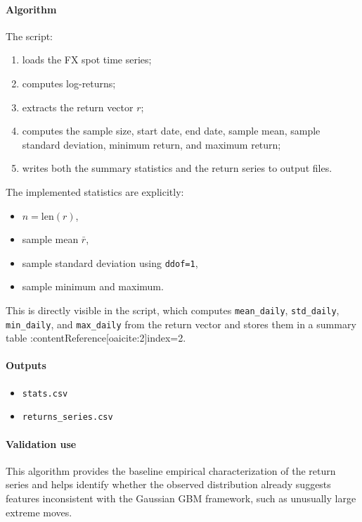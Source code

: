 	\paragraph{Algorithm}
	The script:
	\begin{enumerate}
		\item loads the FX spot time series;
		\item computes log-returns;
		\item extracts the return vector \(r\);
		\item computes the sample size, start date, end date, sample mean, sample standard deviation, minimum return, and maximum return;
		\item writes both the summary statistics and the return series to output files.
	\end{enumerate}
	
	The implemented statistics are explicitly:
	\begin{itemize}
		\item \(n = \text{len}(r)\),
		\item sample mean \( \bar r \),
		\item sample standard deviation using \texttt{ddof=1},
		\item sample minimum and maximum.
	\end{itemize}
	
	This is directly visible in the script, which computes \texttt{mean\_daily}, \texttt{std\_daily}, \texttt{min\_daily}, and \texttt{max\_daily} from the return vector and stores them in a summary table :contentReference[oaicite:2]{index=2}.
	
	\paragraph{Outputs}
	\begin{itemize}
		\item \texttt{stats.csv}
		\item \texttt{returns\_series.csv}
	\end{itemize}
	
	\paragraph{Validation use}
	This algorithm provides the baseline empirical characterization of the return series and helps identify whether the observed distribution already suggests features inconsistent with the Gaussian GBM framework, such as unusually large extreme moves.
	
